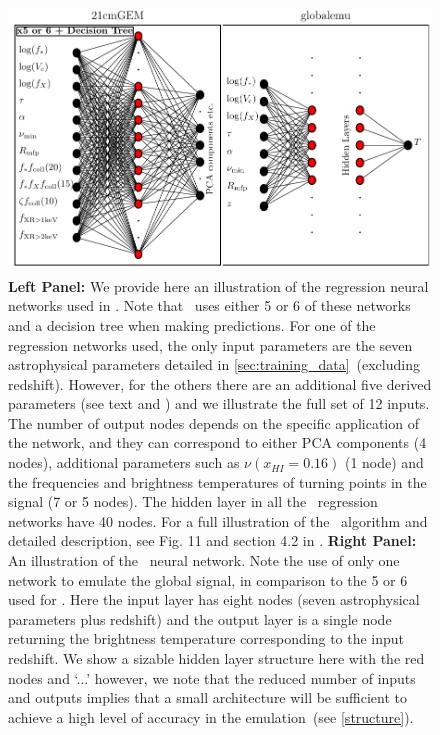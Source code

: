 \begin{figure}
    \centering
    \includegraphics{globalemu/figs/21cmGEM_matplotlib_network_diagram.pdf}
    \caption{\textbf{Left Panel:} We provide here an illustration of the regression neural networks used in \cmGEM. Note that \cmGEM~uses either 5 or 6 of these networks and a decision tree when making predictions.  For one of the regression networks used, the only input parameters are the seven astrophysical parameters detailed in \cref{sec:training_data}~(excluding redshift). However, for the others there are an additional five derived parameters (see text and \protect\cite{Cohen2020}) and we illustrate the full set of 12 inputs. The number of output nodes depends on the specific application of the network, and they can correspond to either PCA components (4 nodes), additional parameters such as $\nu(x_{HI} = 0.16)$ (1 node) and the frequencies and brightness temperatures of turning points in the signal (7 or 5 nodes). The hidden layer in all the \cmGEM~regression networks have 40 nodes. For a full illustration of the \cmGEM~algorithm and detailed description, see Fig. 11 and section 4.2 in \protect\cite{Cohen2020}. \textbf{Right Panel:} An illustration of the \name~neural network. Note the use of only one network to emulate the global signal, in comparison to the 5 or 6 used for \cmGEM. Here the input layer has eight nodes (seven astrophysical parameters plus redshift) and the output layer is a single node returning the brightness temperature corresponding to the input redshift. We show a sizable hidden layer structure here with the red nodes and `...' however, we note that the reduced number of inputs and outputs implies that a small architecture will be sufficient to achieve a high level of accuracy in the emulation~(see \cref{structure}).}
    \label{fig:network_types}
\end{figure}
    

